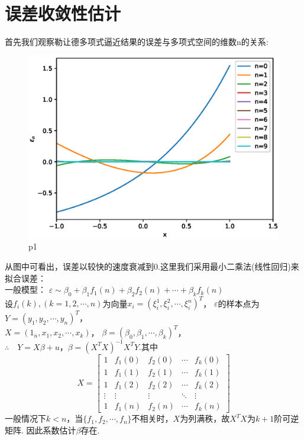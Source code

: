 \documentclass{article}
\begin{document}
    \section{误差收敛性估计}
    首先我们观察勒让德多项式逼近结果的误差与多项式空间的维数n的关系:
    \begin{figure}[H]
        \centering
        \includegraphics{epsilon.eps}
        \caption{p1}
    \end{figure}
    从图中可看出，误差以较快的速度衰减到0.这里我们采用最小二乘法(线性回归)来拟合误差：\\
    一般模型：
    $\varepsilon \sim \beta_0+\beta_1f_1(n)+\beta_2f_2(n)+\cdots+\beta_kf_k(n)$\\
    设$f_i(k),(k=1,2,\cdots,n)$为向量$x_i=(\xi_i^1,\xi_i^2,\cdots,\xi_i^n)^T$，
    $\varepsilon$的样本点为$Y=(y_1,y_2,\cdots,y_n)^T$，\\
    $X=(1_n,x_1,x_2,\cdots,x_k)$，
    $\beta=(\beta_0,\beta_1,\cdots,\beta_k)^T$，\\
    $\therefore \quad Y=X\beta+u$，$\beta=(X^TX)^{-1}X^TY$.其中
    $$
    X=\begin{bmatrix}
        1 & f_1(0) & f_2(0) & \cdots & f_k(0)\\
        1 & f_1(1) & f_2(1) & \cdots & f_k(1)\\
        1 & f_1(2) & f_2(2) & \cdots & f_k(2)\\
        \vdots & \vdots & \vdots & \ddots & \vdots \\
        1 & f_1(n) & f_2(n) & \cdots & f_k(n)
    \end{bmatrix}
    $$
    一般情况下$k<n$，当$\{f_1,f_2,\cdots,f_n\}$不相关时，$X$为列满秩，故$X^TX$为$k+1$阶可逆矩阵.
    因此系数估计$\beta$存在.
\end{document}
